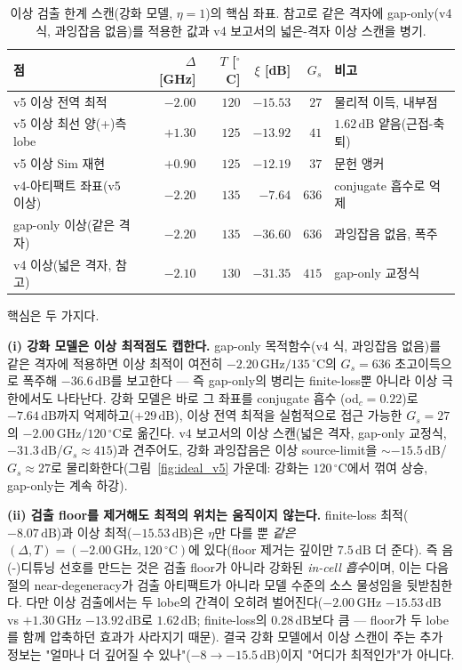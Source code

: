 \documentclass[11pt,a4paper]{article}
\newcommand{\dB}{\,\mathrm{dB}}
\newcommand{\GHz}{\,\mathrm{GHz}}
\newcommand{\degC}{\,^{\circ}\mathrm{C}}
\begin{document}
\begin{table}[h]
\centering
\caption{이상 검출 한계 스캔(강화 모델, $\eta=1$)의 핵심 좌표. 참고로 같은 격자에
gap-only(v4 식, 과잉잡음 없음)를 적용한 값과 v4 보고서의 넓은-격자 이상 스캔을 병기.}
\label{tab:v5ideal}
\small
\setlength{\tabcolsep}{3pt}
\begin{tabularx}{\textwidth}{>{\raggedright\arraybackslash}Xrrrr>{\raggedright\arraybackslash}X}
\toprule
점 & $\Delta$ [GHz] & $T$ [$^\circ$C] & $\xi$ [dB] & $G_s$ & 비고\\
\midrule
v5 이상 전역 최적          & $-2.00$ & $120$ & $-15.53$ & $27$  & 물리적 이득, 내부점\\
v5 이상 최선 양(+)측 lobe  & $+1.30$ & $125$ & $-13.92$ & $41$  & $1.62\dB$ 얕음(근접-축퇴)\\
v5 이상 Sim 재현           & $+0.90$ & $125$ & $-12.19$ & $37$  & 문헌 앵커\\
v4-아티팩트 좌표(v5 이상)  & $-2.20$ & $135$ & $-7.64$  & $636$ & conjugate 흡수로 억제\\
gap-only 이상(같은 격자)   & $-2.20$ & $135$ & $-36.60$ & $636$ & 과잉잡음 없음, 폭주\\
v4 이상(넓은 격자, 참고)   & $-2.10$ & $130$ & $-31.35$ & $415$ & gap-only 교정식\\
\bottomrule
\end{tabularx}
\end{table}

핵심은 두 가지다.

\textbf{(i) 강화 모델은 이상 최적점도 캡한다.} gap-only 목적함수(v4 식, 과잉잡음
없음)를 같은 격자에 적용하면 이상 최적이 여전히 $-2.20\GHz/135\degC$의 $G_s=636$
초고이득으로 폭주해 $-36.6\dB$를 보고한다 --- 즉 gap-only의 병리는 finite-loss뿐
아니라 이상 극한에서도 나타난다. 강화 모델은 바로 그 좌표를 conjugate 흡수
(od$_c=0.22$)로 $-7.64\dB$까지 억제하고($+29\dB$), 이상 전역 최적을 실험적으로 접근
가능한 $G_s=27$의 $-2.00\GHz/120\degC$로 옮긴다. v4 보고서의 이상 스캔(넓은 격자,
gap-only 교정식, $-31.3\dB$/$G_s\approx415$)과 견주어도, 강화 과잉잡음은 이상
source-limit을 $\sim-15.5\dB$/$G_s\approx27$로 물리화한다(그림~\ref{fig:ideal_v5}
가운데: 강화는 $120\degC$에서 꺾여 상승, gap-only는 계속 하강).

\textbf{(ii) 검출 floor를 제거해도 최적의 위치는 움직이지 않는다.} finite-loss
최적($-8.07\dB$)과 이상 최적($-15.53\dB$)은 $\eta$만 다를 뿐 \emph{같은}
$(\Delta,T)=(-2.00\GHz,120\degC)$에 있다(floor 제거는 깊이만 $7.5\dB$ 더 준다). 즉
음(-)디튜닝 선호를 만드는 것은 검출 floor가 아니라 강화된 \emph{in-cell 흡수}이며,
이는 다음 절의 near-degeneracy가 검출 아티팩트가 아니라 모델 수준의 소스 물성임을
뒷받침한다. 다만 이상 검출에서는 두 lobe의 간격이 오히려 벌어진다($-2.00\GHz$
$-15.53\dB$ vs $+1.30\GHz$ $-13.92\dB$로 $1.62\dB$; finite-loss의 $0.28\dB$보다 큼
--- floor가 두 lobe를 함께 압축하던 효과가 사라지기 때문). 결국 강화 모델에서 이상
스캔이 주는 추가 정보는 "얼마나 더 깊어질 수 있나"($-8\to-15.5\dB$)이지 "어디가
최적인가"가 아니다.
\end{document}
